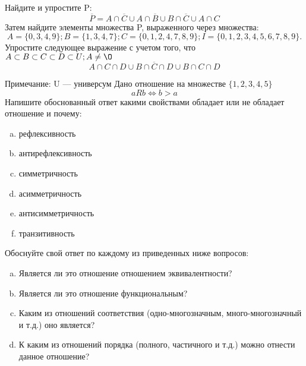 \documentclass[10pt]{exam}
\begin{document}
\begin{questions}
\question
Найдите и упростите P:
\begin{equation*}
\overline{P} = A \cap \overline{C} \cup A \cap \overline{B} \cup B \cap \overline{C} \cup A \cap C
\end{equation*}
Затем найдите элементы множества P, выраженного через множества:
\begin{equation*}
A = \{0, 3, 4, 9\}; 
B = \{1, 3, 4, 7\};
C = \{0, 1, 2, 4, 7, 8, 9\};
I = \{0, 1, 2, 3, 4, 5, 6, 7, 8, 9\}.
\end{equation*}\question
Упростите следующее выражение с учетом того, что $A\subset B \subset C \subset D \subset U; A \neq \O$
\begin{equation*}
A \cap C  \cap D \cup B \cap \overline{C} \cap D \cup B \cap C \cap D
\end{equation*}

Примечание: U — универсум\question
Дано отношение на множестве $\{1, 2, 3, 4, 5\}$ 
\begin{equation*}
aRb \iff b > a
\end{equation*}
Напишите обоснованный ответ какими свойствами обладает или не обладает отношение и почему:   
\begin{enumerate} [a)]\setcounter{enumi}{0}
\item рефлексивность
\item антирефлексивность
\item симметричность
\item асимметричность
\item антисимметричность
\item транзитивность
\end{enumerate}

Обоснуйте свой ответ по каждому из приведенных ниже вопросов:
\begin{enumerate} [a)]\setcounter{enumi}{0}
    \item Является ли это отношение отношением эквивалентности?
    \item Является ли это отношение функциональным?
    \item Каким из отношений соответствия (одно-многозначным, много-многозначный и т.д.) оно является?
    \item К каким из отношений порядка (полного, частичного и т.д.) можно отнести данное отношение?
\end{enumerate}


\end{questions}
\end{document}

